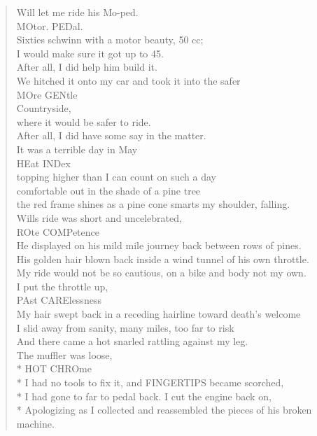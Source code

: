 \documentclass[times,12pt]{book}
\begin{document}
\begin{verse}
Will let me ride his Mo-ped.\\
MOtor. PEDal.\\
Sixties schwinn with a motor beauty, 50 cc;\\
I would make sure it got up to 45.\\
After all, I did help him build it.\\[10pt]

We hitched it onto my car and took it into the safer\\
MOre GENtle\\
Countryside,\\
where it would be safer to ride.\\
After all, I did have some say in the matter.\\[10pt]

It was a terrible day in May\\
HEat INDex\\
topping higher than I can count on such a day\\
comfortable out in the shade of a pine tree\\
the red frame shines as a pine cone smarts my shoulder, falling.\\[10pt]

Wills ride was short and uncelebrated,\\
ROte COMPetence\\
He displayed on his mild mile journey back between rows of pines.\\
His golden hair blown back inside a wind tunnel of his own throttle.\\
My ride would not be so cautious, on a bike and body not my own.\\[10pt]

I put the throttle up,\\
PAst CARElessness\\
My hair swept back in a receding hairline toward death's welcome\\
I slid away from sanity, many miles, too far to risk\\
And there came a hot snarled rattling against my leg.\\[10pt]

The muffler was loose,\\*
HOT CHROme\\*
I had no tools to fix it, and FINGERTIPS became scorched,\\*
I had gone to far to pedal back. I cut the engine back on,\\*
Apologizing as I collected and reassembled the pieces of his broken machine.
\end{verse}
\newpage
\end{document}
